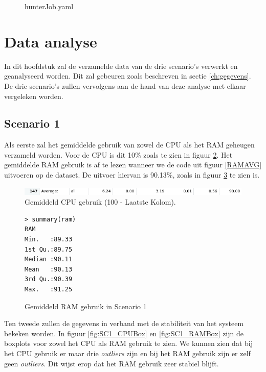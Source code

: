 \begin{figure}[h] 
	\centering
	\inputminted[fontsize=\footnotesize,linenos]{yaml}{files/hunterJob.yaml}
	\caption{hunterJob.yaml}
	\label{hunterjob}
\end{figure}

\clearpage
\section{Data analyse} 
In dit hoofdstuk zal de verzamelde data van de drie scenario's verwerkt en geanalyseerd worden. Dit zal gebeuren zoals beschreven in sectie \ref{ch:gegevens}. De drie scenario's zullen vervolgens aan de hand van deze analyse met elkaar vergeleken worden.

\clearpage
\subsection{Scenario 1}
Als eerste zal het gemiddelde gebruik van zowel de CPU als het RAM geheugen verzameld worden. Voor de CPU is dit 10\% zoals te zien in figuur \ref{fig:SC1_CPUAVG}. Het gemiddelde RAM gebruik is af te lezen wanneer we de code uit figuur \ref{RAMAVG} uitvoeren op de dataset. De uitvoer hiervan is 90.13\%, zoals in figuur \ref{SC1_RAMAVG} te zien is.
\begin{figure}[h]
	\centering
	\includegraphics[width=\linewidth]{img/SC1_CPUAVG.png}
	\caption{Gemiddeld CPU gebruik (100 - Laatste Kolom).}
	\label{fig:SC1_CPUAVG}
\end{figure}
\begin{figure}[h]
	\centering
	\begin{verbatim} 
> summary(ram)
RAM       
Min.   :89.33  
1st Qu.:89.75  
Median :90.11  
Mean   :90.13  
3rd Qu.:90.39  
Max.   :91.25
	\end{verbatim}
	\caption{Gemiddeld RAM gebruik in Scenario 1}
	\label{SC1_RAMAVG}
\end{figure}

Ten tweede zullen de gegevens in verband met de stabiliteit van het systeem bekeken worden. In figuur \ref{fig:SC1_CPUBox} en \ref{fig:SC1_RAMBox} zijn de boxplots voor zowel het CPU als RAM gebruik te zien. We kunnen zien dat bij het CPU gebruik er maar drie \textit{outliers} zijn en bij het RAM gebruik zijn er zelf geen \textit{outliers}. Dit wijst erop dat het RAM gebruik zeer stabiel blijft. 

